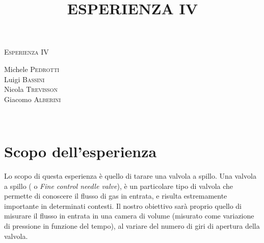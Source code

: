 \documentclass[11pt]{article}
\begin{document}
\begin{center}



\textsc{\Huge Esperienza IV}\\[0.5cm]



\large
\title{ESPERIENZA IV}

Michele \textsc{Pedrotti}\\
Luigi \textsc{Bassini}\\
Nicola \textsc{Trevisson}\\
Giacomo \textsc{Alberini}






\end{center}


~\\
\section{Scopo dell'esperienza}
Lo scopo di questa esperienza è quello di tarare una valvola a spillo. Una valvola a spillo ( o \textit{Fine control needle valve}), è un particolare tipo di valvola che permette di conoscere il flusso di gas in entrata, e risulta estremamente importante in determinati contesti. Il nostro obiettivo sarà proprio quello di misurare il flusso in entrata in una camera di volume (misurato come variazione di pressione in funzione del tempo), al variare del numero di giri di apertura della valvola.
\end{document}
